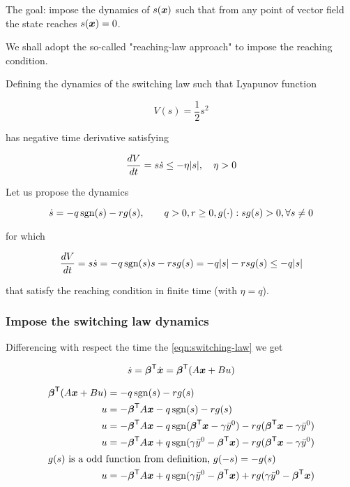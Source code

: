 The goal: impose the dynamics of $s(\boldsymbol{x})$ such that from any point of vector field the state reaches $s(\boldsymbol{x}) = 0$.

We shall adopt the so-called "reaching-law approach" to impose the reaching condition.

Defining the dynamics of the switching law such that Lyapunov function

\[
    V(s) = \frac{1}{2} s^2
\]

has negative time derivative satisfying

\[
    \frac{d V}{d t} = s \dot s \leq - \eta |s|, \quad \eta > 0
\]

Let us propose the dynamics

\[
    \dot s = -q \operatorname{sgn}(s) - r g(s), \qquad q> 0, r \geq 0, g(\cdot) : sg(s) > 0, \forall s \neq 0
\]

for which

\[
    \frac{d V}{d t} = s \dot s = -q \operatorname{sgn}(s) s - r s g(s) = -q |s| - r s g(s) \leq - q |s|
\]

that satisfy the reaching condition in finite time (with $\eta = q$).

\subsubsection{Impose the switching law dynamics}

Differencing with respect the time the \cref{eqn:switching-law} we get

\[
    \dot s = \boldsymbol{\beta}^{\mathsf{T}} \dot{\boldsymbol{x}} = \boldsymbol{\beta}^{\mathsf{T}} (A \boldsymbol{x} + B u)
\]

\begin{align*}
    \boldsymbol{\beta}^{\mathsf{T}} (A \boldsymbol{x} + B u) &= -q \operatorname{sgn}(s) - r g(s) \\
    u &= - \boldsymbol{\beta}^{\mathsf{T}} A \boldsymbol{x} -q \operatorname{sgn}(s) - r g(s) \\
    u &= - \boldsymbol{\beta}^{\mathsf{T}} A \boldsymbol{x} -q \operatorname{sgn}(\boldsymbol{\beta}^{\mathsf{T}} \boldsymbol{x} - \gamma \bar y^0) - r g(\boldsymbol{\beta}^{\mathsf{T}} \boldsymbol{x} - \gamma \bar y^0) \\
    u &= - \boldsymbol{\beta}^{\mathsf{T}} A \boldsymbol{x} + q \operatorname{sgn}(\gamma \bar y^0 - \boldsymbol{\beta}^{\mathsf{T}} \boldsymbol{x}) - r g(\boldsymbol{\beta}^{\mathsf{T}} \boldsymbol{x} - \gamma \bar y^0) \\
    \intertext{$g(s)$ is a odd function from definition, $g(-s)=-g(s)$}
    u &= - \boldsymbol{\beta}^{\mathsf{T}} A \boldsymbol{x} + q \operatorname{sgn}(\gamma \bar y^0 - \boldsymbol{\beta}^{\mathsf{T}} \boldsymbol{x}) + r g(\gamma \bar y^0 - \boldsymbol{\beta}^{\mathsf{T}} \boldsymbol{x})
\end{align*}

